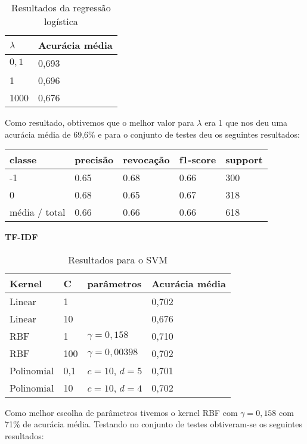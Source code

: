 \begin{table}[H]
	\centering
	\caption{Resultados da regressão logística}
	\begin{tabular}{l l}
		\hline
		$\lambda$ & Acurácia média \\
		\hline
		$0,1$ & 0,693 \\
		\hline
		1 & 0,696 \\
		\hline
		1000 & 0,676 \\
	\end{tabular}
\end{table}

Como resultado, obtivemos que o melhor valor para $\lambda$ era 1 que nos deu uma acurácia
média de 69,6\% e para o conjunto de testes deu os seguintes resultados:

\begin{table}[H]
	\centering
		\begin{tabular}{l | l | l | l | l}
		\hline
		classe  	&	precisão  &  revocação &  f1-score &  support \\
		\hline
		 -1    &   0.65   &   0.68   &   0.66   &    300 \\
		 \hline
          0    &   0.68   &   0.65   &   0.67   &    318 \\
		\hline
		média / total   &    0.66   &   0.66   &   0.66   &    618 \\
		\hline
	\end{tabular}
\end{table}


\textbf{TF-IDF}

\begin{table}[H]
	\centering
	\caption{Resultados para o SVM}
	\begin{tabular}{l l l l}
		\hline
		Kernel & C & parâmetros & Acurácia média \\
		\hline
		Linear & 1 & & 0,702 \\
		\hline
		Linear & 10 & & 0,676 \\
		\hline
		RBF & 1 & $\gamma = 0,158$ & 0,710 \\
		\hline
		RBF & 100 & $\gamma = 0,00398$ & 0,702 \\
		\hline
		Polinomial & 0,1 & $c = 10$, $d = 5$ & 0,701 \\
		\hline
		Polinomial & 10 & $c = 10$, $d = 4$ & 0,702 \\
		\hline
	\end{tabular}
\end{table}

Como melhor escolha de parâmetros tivemos o kernel RBF com $\gamma = 0,158$ com 71\% de
acurácia média. Testando no conjunto de testes obtiveram-se os seguintes resultados:


